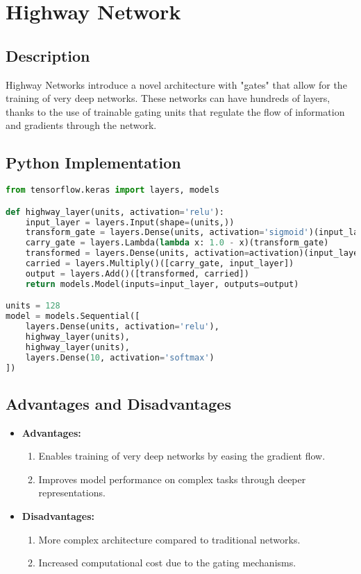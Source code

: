 \chapter{Highway Network}

\section{Description}
Highway Networks introduce a novel architecture with "gates" that allow for the training of very deep networks. These networks can have hundreds of layers, thanks to the use of trainable gating units that regulate the flow of information and gradients through the network.

\section{Python Implementation}
\begin{lstlisting}[language=Python]
from tensorflow.keras import layers, models

def highway_layer(units, activation='relu'):
    input_layer = layers.Input(shape=(units,))
    transform_gate = layers.Dense(units, activation='sigmoid')(input_layer)
    carry_gate = layers.Lambda(lambda x: 1.0 - x)(transform_gate)
    transformed = layers.Dense(units, activation=activation)(input_layer)
    carried = layers.Multiply()([carry_gate, input_layer])
    output = layers.Add()([transformed, carried])
    return models.Model(inputs=input_layer, outputs=output)

units = 128
model = models.Sequential([
    layers.Dense(units, activation='relu'),
    highway_layer(units),
    highway_layer(units),
    layers.Dense(10, activation='softmax')
])
\end{lstlisting}

\section{Advantages and Disadvantages}
\begin{itemize}
    \item \textbf{Advantages:}
    \begin{enumerate}
        \item Enables training of very deep networks by easing the gradient flow.
        \item Improves model performance on complex tasks through deeper representations.
    \end{enumerate}
    \item \textbf{Disadvantages:}
    \begin{enumerate}
        \item More complex architecture compared to traditional networks.
        \item Increased computational cost due to the gating mechanisms.
    \end{enumerate}
\end{itemize}

